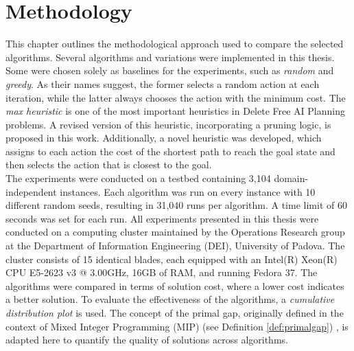 \chapter{Methodology}
\label{ch:methodology}
This chapter outlines the methodological approach used to compare the selected algorithms.
Several algorithms and variations were implemented in this thesis. Some
were chosen solely as baselines for the experiments, such as \textit{random} and \textit{greedy}.
As their names suggest, the former selects a random action at each iteration, while the latter
always chooses the action with the minimum cost.
The \textit{max heuristic} \cite{bonet2001planning} is one of the most important
heuristics in Delete Free AI Planning problems. A revised version of this heuristic, incorporating
a pruning logic, is proposed in this work.
Additionally, a novel heuristic was developed, which assigns to each action the cost of the shortest path to reach the goal
state and then selects the action that is closest to the goal.\\
The experiments were conducted on a testbed containing 3,104 domain-independent instances.
Each algorithm was run on every instance with 10 different random seeds, resulting in 31,040 runs
per algorithm. A time limit of 60 seconds was set for each run.
All experiments presented in this thesis were conducted on a computing cluster maintained by the Operations Research group at the
Department of Information Engineering (DEI), University of Padova.
The cluster consists of 15 identical blades, each equipped with an Intel(R) Xeon(R) CPU E5-2623 v3 @ 3.00GHz, 16GB of RAM, and running Fedora 37.
The algorithms were compared in terms of solution cost, where a lower cost indicates a better solution.
To evaluate the effectiveness of the algorithms, a \textit{cumulative distribution plot} is used.
The concept of the primal gap, originally defined in the context of Mixed Integer Programming (MIP)
(see Definition \ref{def:primalgap}) \cite{berthold2013measuring}, is adapted here to quantify the quality of solutions across algorithms.

